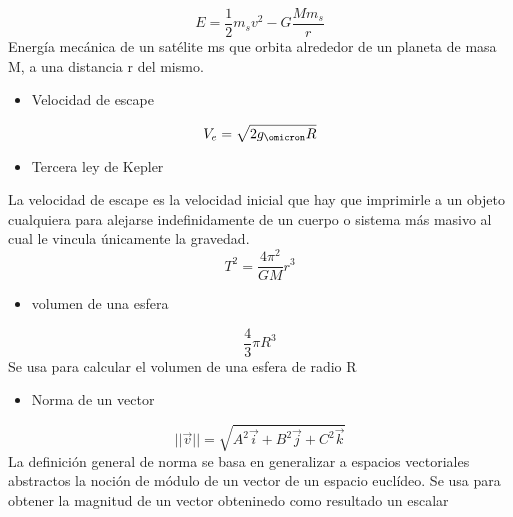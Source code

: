\documentclass[4apaper, 12pt]{article}
\begin{document}
    \begin{equation}
      E=\frac{1}{2}m_sv^{2}-G\frac{Mm_s}{r}
    \end{equation}
    Energía mecánica de un satélite ms  que orbita alrededor de un planeta de masa M, a una distancia r del mismo.
    \begin{itemize}
        \item[\bigstar]{Velocidad de escape}
    \end{itemize}   
    \begin{equation}
        V_e=\sqrt{2g_\omicron R}
    \end{equation}
    \begin{itemize}
        \item[\checkmark]{Tercera ley de Kepler}
    \end{itemize}
    La velocidad de escape es la velocidad inicial que hay que imprimirle a un objeto cualquiera para alejarse indefinidamente de un cuerpo o sistema más masivo al cual le vincula únicamente la gravedad.
    \begin{equation}
        T^{2}=\frac{4\pi^{2}}{GM}r^{3}
    \end{equation}
    \begin{itemize}
        \item {volumen de una esfera}
    \end{itemize}
    \begin{equation}
        \frac{4}{3}\pi R^{3}
    \end{equation} 
    Se usa para calcular el volumen de una esfera de radio R
    \begin{itemize}
        \item[\heartsuit] {Norma de un vector}
    \end{itemize}
    \begin{equation}
     ||\vec{v}|| = \sqrt{A^2\vec{i} + B^2\vec{j} + C^2\vec{k}}
    \end{equation}
    La definición general de norma se basa en generalizar a espacios vectoriales abstractos la noción de módulo de un vector de un espacio euclídeo. Se usa para obtener la magnitud de un vector obteninedo como resultado un escalar
\end{document}

